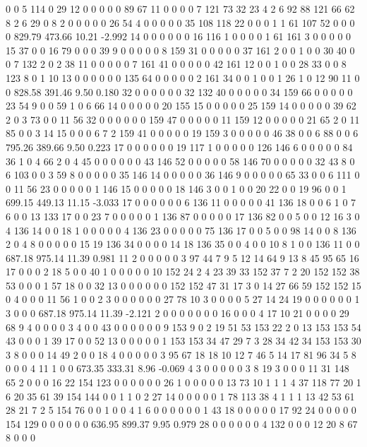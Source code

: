  0 0 5 114 0 29 12 0 0 0 0 0 89 67 11 0 0 0 0 7
 121 73 32 23 4 2 6 92 88 121 66 62 8 2 6 29 0 8 2 0
 0 0 0 0 26 54 4 0 0 0 0 0 35 108 118 22 0 0 0 1
 1 61 107 52 0 0 0 0
829.79 473.66 10.21 -2.992
 14 0 0 0 0 0 0 16 116 1 0 0 0 0 1 61 161 3 0 0
 0 0 0 15 37 0 0 16 79 0 0 0 39 9 0 0 0 0 0 8
 159 31 0 0 0 0 0 37 161 2 0 0 1 0 0 30 40 0 0 7
 132 2 0 2 38 11 0 0 0 0 0 7 161 41 0 0 0 0 0 42
 161 12 0 0 1 0 0 28 33 0 0 8 123 8 0 1 10 13 0 0
 0 0 0 0 135 64 0 0 0 0 0 2 161 34 0 0 1 0 0 1
 26 1 0 12 90 11 0 0
828.58 391.46 9.50 0.180
 32 0 0 0 0 0 0 32 132 40 0 0 0 0 0 34 159 66 0 0
 0 0 0 23 54 9 0 0 59 1 0 6 66 14 0 0 0 0 0 20
 155 15 0 0 0 0 0 25 159 14 0 0 0 0 0 39 62 2 0 3
 73 0 0 11 56 32 0 0 0 0 0 0 159 47 0 0 0 0 0 11
 159 12 0 0 0 0 0 21 65 2 0 11 85 0 0 3 14 15 0 0
 0 6 7 2 159 41 0 0 0 0 0 19 159 3 0 0 0 0 0 46
 38 0 0 6 88 0 0 6
795.26 389.66 9.50 0.223
 17 0 0 0 0 0 0 19 117 1 0 0 0 0 0 126 146 6 0 0
 0 0 0 84 36 1 0 4 66 2 0 4 45 0 0 0 0 0 0 43
 146 52 0 0 0 0 0 58 146 70 0 0 0 0 0 32 43 8 0 6
 103 0 0 3 59 8 0 0 0 0 0 35 146 14 0 0 0 0 0 36
 146 9 0 0 0 0 0 65 33 0 0 6 111 0 0 11 56 23 0 0
 0 0 0 1 146 15 0 0 0 0 0 18 146 3 0 0 1 0 0 20
 22 0 0 19 96 0 0 1
699.15 449.13 11.15 -3.033
 17 0 0 0 0 0 0 6 136 11 0 0 0 0 0 41 136 18 0 0
 6 1 0 7 6 0 0 13 133 17 0 0 23 7 0 0 0 0 0 1
 136 87 0 0 0 0 0 17 136 82 0 0 5 0 0 12 16 3 0 4
 136 14 0 0 18 1 0 0 0 0 0 4 136 23 0 0 0 0 0 75
 136 17 0 0 5 0 0 98 14 0 0 8 136 2 0 4 8 0 0 0
 0 0 15 19 136 34 0 0 0 0 14 18 136 35 0 0 4 0 0 10
 8 1 0 0 136 11 0 0
687.18 975.14 11.39 0.981
 11 2 0 0 0 0 0 3 97 44 7 9 5 12 14 64 9 13 8 45
 95 65 16 17 0 0 0 2 18 5 0 0 40 1 0 0 0 0 0 10
 152 24 2 4 23 39 33 152 37 7 2 20 152 152 38 53 0 0 0 1
 57 18 0 0 32 13 0 0 0 0 0 0 152 152 47 31 17 3 0 14
 27 66 59 152 152 15 0 4 0 0 0 11 56 1 0 0 2 3 0 0
 0 0 0 0 27 78 10 3 0 0 0 0 5 27 14 24 19 0 0 0
 0 0 0 1 3 0 0 0
687.18 975.14 11.39 -2.121
 2 0 0 0 0 0 0 0 16 0 0 0 4 17 10 21 0 0 0 0
 29 68 9 4 0 0 0 0 3 4 0 0 43 0 0 0 0 0 0 9
 153 9 0 2 19 51 53 153 22 2 0 13 153 153 54 43 0 0 0 1
 39 17 0 0 52 13 0 0 0 0 0 1 153 153 34 47 29 7 3 28
 34 42 34 153 153 30 3 8 0 0 0 14 49 2 0 0 18 4 0 0
 0 0 0 3 95 67 18 18 10 12 7 46 5 14 17 81 96 34 5 8
 0 0 0 4 11 1 0 0
673.35 333.31 8.96 -0.069
 4 3 0 0 0 0 0 3 8 19 3 0 0 0 11 31 148 65 2 0
 0 0 16 22 154 123 0 0 0 0 0 0 26 1 0 0 0 0 0 13
 73 10 1 1 1 4 37 118 77 20 1 6 20 35 61 39 154 144 0 0
 1 1 0 2 27 14 0 0 0 0 0 1 78 113 38 4 1 1 1 13
 42 53 61 28 21 7 2 5 154 76 0 0 1 0 0 4 1 6 0 0
 0 0 0 0 1 43 18 0 0 0 0 0 17 92 24 0 0 0 0 0
 154 129 0 0 0 0 0 0
636.95 899.37 9.95 0.979
 28 0 0 0 0 0 0 4 132 0 0 0 12 20 8 67 8 0 0 0
